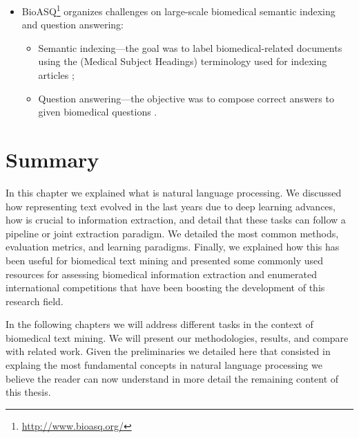\begin{itemize}
\item
BioASQ\footnote{\url{http://www.bioasq.org/}} organizes challenges on large-scale biomedical semantic indexing and question answering:

\begin{itemize}[topsep=0pt]
\item
Semantic indexing---the goal was to label biomedical-related documents using the  (Medical Subject Headings) terminology used for indexing  articles \parencite{tsatsaronis2015a};
\item
Question answering---the objective was to compose correct answers to given biomedical questions \parencite{tsatsaronis2015a}.
\end{itemize}

\end{itemize}


\section{Summary}

In this chapter we explained what is natural language processing. We discussed how representing text evolved in the last years due to deep learning advances, how  is crucial to information extraction, and detail that these tasks can follow a pipeline or joint extraction paradigm.
We detailed the most common methods, evaluation metrics, and learning paradigms.
Finally, we explained how this has been useful for biomedical text mining and presented some commonly used resources for assessing biomedical information extraction and enumerated international competitions that have been boosting the development of this research field.

In the following chapters we will address different  tasks in the context of biomedical text mining.
We will present our methodologies, results, and compare with related work.
Given the preliminaries we detailed here that consisted in explaing the most fundamental concepts in natural language processing we believe the reader can now understand in more detail the remaining content of this thesis.
